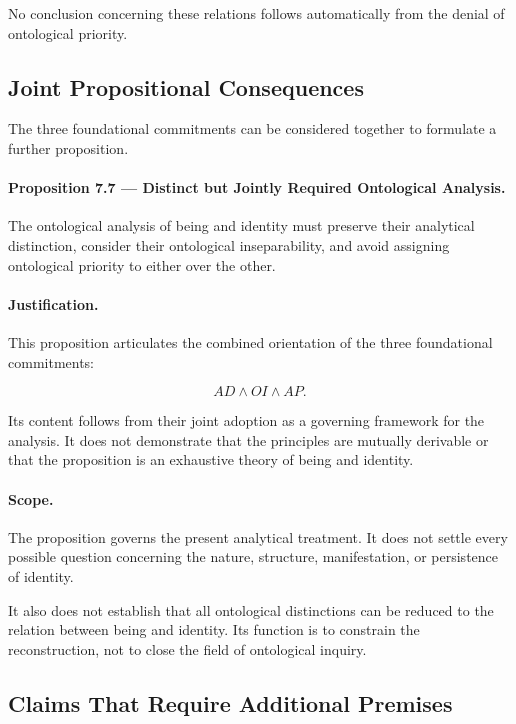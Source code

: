 No conclusion concerning these relations follows automatically
from the denial of ontological priority.

\subsection{Joint Propositional Consequences}

The three foundational commitments can be considered together
to formulate a further proposition.

\paragraph{Proposition 7.7 — Distinct but Jointly Required
Ontological Analysis.}

The ontological analysis of being and identity must preserve
their analytical distinction, consider their ontological
inseparability, and avoid assigning ontological priority
to either over the other.

\paragraph{Justification.}

This proposition articulates the combined orientation of
the three foundational commitments:

\[
    AD \land OI \land AP.
\]

Its content follows from their joint adoption as a governing
framework for the analysis. It does not demonstrate that
the principles are mutually derivable or that the proposition
is an exhaustive theory of being and identity.

\paragraph{Scope.}

The proposition governs the present analytical treatment.
It does not settle every possible question concerning the
nature, structure, manifestation, or persistence of identity.

It also does not establish that all ontological distinctions
can be reduced to the relation between being and identity.
Its function is to constrain the reconstruction, not to
close the field of ontological inquiry.

\subsection{Claims That Require Additional Premises}

